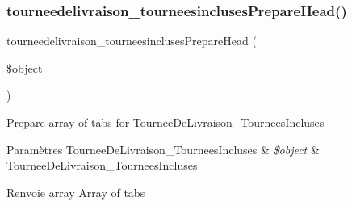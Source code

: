 \subsubsection{\texorpdfstring{tourneedelivraison\+\_\+tourneesincluses\+Prepare\+Head()}{tourneedelivraison\_tourneesinclusesPrepareHead()}}
{\footnotesize\ttfamily tourneedelivraison\+\_\+tourneesincluses\+Prepare\+Head (\begin{DoxyParamCaption}\item[{}]{\$object }\end{DoxyParamCaption})}

Prepare array of tabs for Tournee\+De\+Livraison\+\_\+\+Tournees\+Incluses


\begin{DoxyParams}[1]{Paramètres}
Tournee\+De\+Livraison\+\_\+\+Tournees\+Incluses & {\em \$object} & Tournee\+De\+Livraison\+\_\+\+Tournees\+Incluses \\
\hline
\end{DoxyParams}
\begin{DoxyReturn}{Renvoie}
array Array of tabs 
\end{DoxyReturn}
